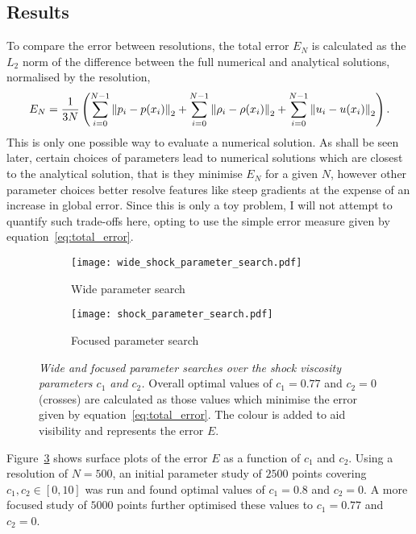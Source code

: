 \subsection{Results}

To compare the error between resolutions, the total error $E_N$ is calculated as the $L_2$ norm of the difference between the full numerical and analytical solutions, normalised by the resolution,
\begin{equation}
  \label{eq:total_error}
E_N = \frac{1}{3N} \left(
\sum_{i=0}^{N-1} \left\lVert p_i - p(x_i)\right\rVert_2
+ \sum_{i=0}^{N-1} \left\lVert\rho_i - \rho(x_i)\right\rVert_2
+ \sum_{i=0}^{N-1} \left\lVert u_i - u(x_i)\right\rVert_2 \right).
\end{equation}
This is only one possible way to evaluate a numerical solution. As shall be seen later, certain choices of parameters lead to numerical solutions which are closest to the analytical solution, that is they minimise $E_N$ for a given $N$, however other parameter choices better resolve features like steep gradients at the expense of an increase in global error. Since this is only a toy problem, I will not attempt to quantify such trade-offs here, opting to use the simple error measure given by equation~\eqref{eq:total_error}.

\begin{figure}[t]
    \hfill
    \begin{subfigure}{0.49\textwidth}
      \centering
      \texttt{[image: wide\_shock\_parameter\_search.pdf]}
      \caption{Wide parameter search}%
      \label{fig:wide_shock_parameter_search}
    \end{subfigure}
    \hfill
    \begin{subfigure}{0.49\textwidth}
      \texttt{[image: shock\_parameter\_search.pdf]}
      \caption{Focused parameter search}%
      \label{fig:shock_parameter_search}
    \end{subfigure}
    \caption{\emph{Wide and focused parameter searches over the shock viscosity parameters $c_1$ and $c_2$.} Overall optimal values of $c_1 = 0.77$ and $c_2 = 0$ (crosses) are calculated as those values which minimise the error given by equation~\eqref{eq:total_error}. The colour is added to aid visibility and represents the error $E$. }
\label{fig:shock_parameter_searches}%
\end{figure}

Figure~\ref{fig:shock_parameter_searches} shows surface plots of the error $E$ as a function of $c_1$ and $c_2$. Using a resolution of $N=500$, an initial parameter study of $2500$ points covering $c_1, c_2 \in [0, 10]$ was run and found optimal values of $c_1 = 0.8$ and $c_2 = 0$. A more focused study of $5000$ points further optimised these values to $c_1 = 0.77$ and $c_2 = 0$.

